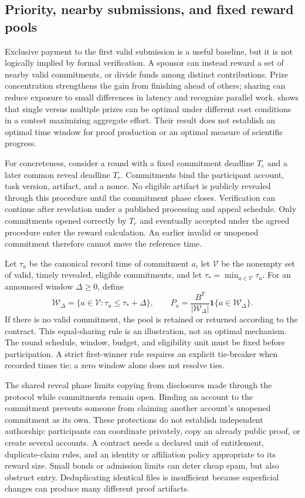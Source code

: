 \documentclass[11pt,a4paper]{article}
\newcommand{\I}{\mathbf{1}}
\begin{document}
\subsection{Priority, nearby submissions, and fixed reward pools}
Exclusive payment to the first valid submission is a useful baseline, but it is not logically implied by formal verification. A sponsor can instead reward a set of nearby valid commitments, or divide funds among distinct contributions. Prize concentration strengthens the gain from finishing ahead of others; sharing can reduce exposure to small differences in latency and recognize parallel work. \citet{moldovanu} shows that single versus multiple prizes can be optimal under different cost conditions in a contest maximizing aggregate effort. Their result does not establish an optimal time window for proof production or an optimal measure of scientific progress.

For concreteness, consider a round with a fixed commitment deadline $T_c$ and a later common reveal deadline $T_r$. Commitments bind the participant account, task version, artifact, and a nonce. No eligible artifact is publicly revealed through this procedure until the commitment phase closes. Verification can continue after revelation under a published processing and appeal schedule. Only commitments opened correctly by $T_r$ and eventually accepted under the agreed procedure enter the reward calculation. An earlier invalid or unopened commitment therefore cannot move the reference time.

Let $\tau_a$ be the canonical record time of commitment $a$, let $\mathcal V$ be the nonempty set of valid, timely revealed, eligible commitments, and let $\tau_* =\min_{a\in\mathcal V}\tau_a$. For an announced window $\Delta\geq0$, define
\[
 \mathcal W_\Delta=\{a\in\mathcal V:\tau_a\leq\tau_*+\Delta\},
 \qquad P_a=\frac{B^T}{|\mathcal W_\Delta|}\I\{a\in\mathcal W_\Delta\}.
\]
If there is no valid commitment, the pool is retained or returned according to the contract. This equal-sharing rule is an illustration, not an optimal mechanism. The round schedule, window, budget, and eligibility unit must be fixed before participation. A strict first-winner rule requires an explicit tie-breaker when recorded times tie; a zero window alone does not resolve ties.

The shared reveal phase limits copying from disclosures made through the protocol while commitments remain open. Binding an account to the commitment prevents someone from claiming another account's unopened commitment as its own. These protections do not establish independent authorship: participants can coordinate privately, copy an already public proof, or create several accounts. A contract needs a declared unit of entitlement, duplicate-claim rules, and an identity or affiliation policy appropriate to its reward size. Small bonds or admission limits can deter cheap spam, but also obstruct entry. Deduplicating identical files is insufficient because superficial changes can produce many different proof artifacts.
\end{document}

